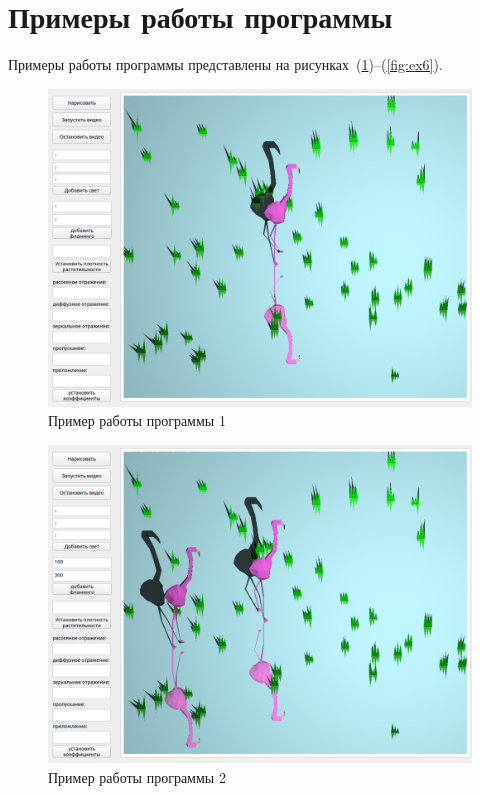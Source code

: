 \section{Примеры работы программы}

Примеры работы программы представлены на рисунках~(\ref{fig:ex1})--(\ref{fig:ex6}).

\begin{figure}[h!]
	\centering
	\includegraphics[width=0.8\linewidth]{img/ex1}
	\caption{Пример работы программы 1}
	\label{fig:ex1}
\end{figure}

\begin{figure}[h!]
	\centering
	\includegraphics[width=0.9\linewidth]{img/ex2}
	\caption{Пример работы программы 2}
	\label{fig:ex2}
\end{figure}

